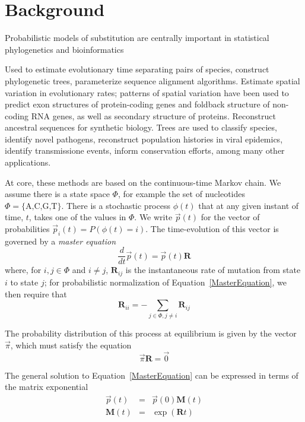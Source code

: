 \documentclass{bmcart}
\newcommand{\matr}[1]{\mathbf{#1}}
\newcommand{\eqref}[1]{Equation~\ref{#1}}
\begin{document}
\section*{Background}

Probabilistic models of substitution are centrally important in statistical phylogenetics and bioinformatics

Used to estimate evolutionary time separating pairs of species,
construct phylogenetic trees,
parameterize sequence alignment algorithms.
Estimate spatial variation in evolutionary rates;
patterns of spatial variation have been used to
predict exon structures of protein-coding genes
and foldback structure of non-coding RNA genes,
as well as secondary structure of proteins.
Reconstruct ancestral sequences for synthetic biology.
Trees are used to classify species,
identify novel pathogens,
reconstruct population histories in viral epidemics,
identify transmissione events,
inform conservation efforts,
among many other applications.

At core, these methods are based on the continuous-time Markov chain.
We assume there is a state space $\Phi$,
for example the set of nucleotides $\Phi = \{ \mbox{A,C,G,T} \}$.
There is a stochastic process $\phi(t)$ that at any given instant of time, $t$,
takes one of the values in $\Phi$.
We write $\vec{p}(t)$ for the vector of probabilities
$\vec{p}_i(t) = P(\phi(t) = i)$.
The time-evolution of this vector is governed by a {\em master equation}
\begin{equation}
\frac{d}{dt} \vec{p}(t) = \vec{p}(t) \matr{R}
\label{MasterEquation}
\end{equation}
where, for $i,j \in \Phi$ and $i \neq j$,
$\matr{R}_{ij}$ is the instantaneous rate of mutation from state $i$ to state $j$;
for probabilistic normalization of \eqref{MasterEquation},
we then require that
\[
\matr{R}_{ii} = -\sum_{j \in \Phi, j \neq i} \matr{R}_{ij}
\]

The probability distribution of this process at equilibrium is given by the vector $\vec{\pi}$,
which must satisfy the equation
\[
\vec{\pi} \matr{R} = \vec{0}
\]

The general solution to \eqref{MasterEquation} can be expressed in terms of the matrix exponential
\begin{eqnarray}
\vec{p}(t) & = & \vec{p}(0) \matr{M}(t) \nonumber \\
\matr{M}(t) & = & \exp ( \matr{R}t )
\label{MatrixExponential}
\end{eqnarray}
\end{document}
